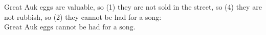 Great Auk eggs are valuable, so (1) they are not sold in the street, so (4) they are not rubbish, so (2) they cannot be had for a song: $\boxed{\text{Great Auk eggs cannot be had for a song.}}$
